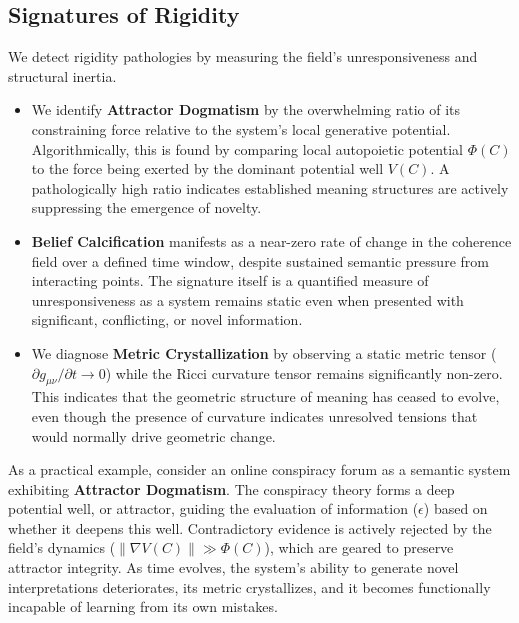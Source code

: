 \subsection{Signatures of Rigidity}
\label{16.3.1:signatures_of_rigidity}

We detect rigidity pathologies by measuring the field's unresponsiveness and structural inertia.

\begin{itemize}

    \item We identify \textbf{Attractor Dogmatism} by the overwhelming ratio of its constraining force relative to the system's local generative potential. Algorithmically, this is found by comparing local autopoietic potential \(\Phi(C)\) to the force being exerted by the dominant potential well \(V(C)\). A pathologically high ratio indicates established meaning structures are actively suppressing the emergence of novelty.

    \item \textbf{Belief Calcification} manifests as a near-zero rate of change in the coherence field over a defined time window, despite sustained semantic pressure from interacting points. The signature itself is a quantified measure of unresponsiveness as a system remains static even when presented with significant, conflicting, or novel information.

    \item We diagnose \textbf{Metric Crystallization} by observing a static metric tensor (\(\partial g_{\mu\nu} / \partial t \to 0\)) while the Ricci curvature tensor remains significantly non-zero. This indicates that the geometric structure of meaning has ceased to evolve, even though the presence of curvature indicates unresolved tensions that would normally drive geometric change.

\end{itemize}

As a practical example, consider an online conspiracy forum as a semantic system exhibiting \textbf{Attractor Dogmatism}. The conspiracy theory forms a deep potential well, or attractor, guiding the evaluation of information (\(\epsilon\)) based on whether it deepens this well. Contradictory evidence is actively rejected by the field's dynamics (\(\|\nabla V(C)\| \gg \Phi(C)\)), which are geared to preserve attractor integrity. As time evolves, the system's ability to generate novel interpretations deteriorates, its metric crystallizes, and it becomes functionally incapable of learning from its own mistakes.

